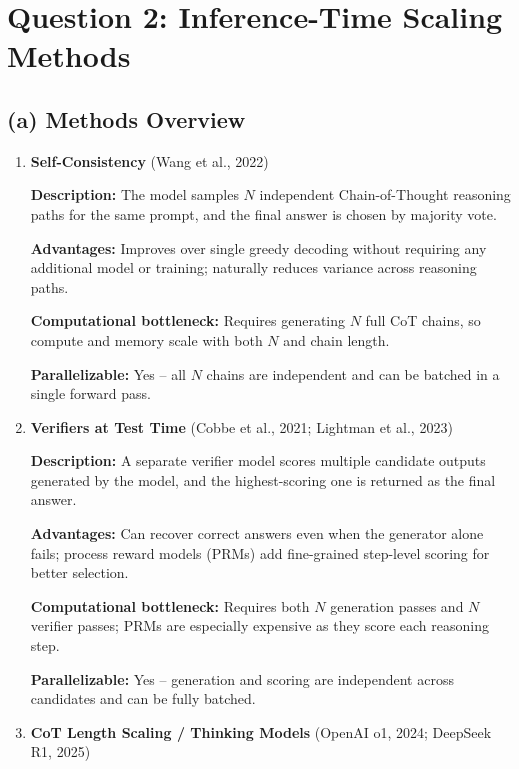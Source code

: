 \documentclass[12pt]{article}
\begin{document}
\section*{Question 2: Inference-Time Scaling Methods}

\subsection*{(a) Methods Overview}

\begin{enumerate}

    \item \textbf{Self-Consistency} (Wang et al., 2022)

    \textbf{Description:} The model samples $N$ independent Chain-of-Thought reasoning
    paths for the same prompt, and the final answer is chosen by majority vote.

    \textbf{Advantages:} Improves over single greedy decoding without requiring any
    additional model or training; naturally reduces variance across reasoning paths.

    \textbf{Computational bottleneck:} Requires generating $N$ full CoT chains, so
    compute and memory scale with both $N$ and chain length.

    \textbf{Parallelizable:} Yes -- all $N$ chains are independent and can be batched
    in a single forward pass.

    \item \textbf{Verifiers at Test Time} (Cobbe et al., 2021; Lightman et al., 2023)

    \textbf{Description:} A separate verifier model scores multiple candidate outputs
    generated by the model, and the highest-scoring one is returned as the final answer.

    \textbf{Advantages:} Can recover correct answers even when the generator alone fails;
    process reward models (PRMs) add fine-grained step-level scoring for better selection.

    \textbf{Computational bottleneck:} Requires both $N$ generation passes and $N$
    verifier passes; PRMs are especially expensive as they score each reasoning step.

    \textbf{Parallelizable:} Yes -- generation and scoring are independent across
    candidates and can be fully batched.

    \item \textbf{CoT Length Scaling / Thinking Models} (OpenAI o1, 2024; DeepSeek R1, 2025)


\end{enumerate}
\end{document}
